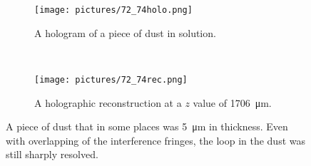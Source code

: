 %
%
%


\begin{figure}[ht!]
    \begin{center}

        \begin{subfigure}[t]{0.4\textwidth}
            \label{fig:72_74holo}
            \texttt{[image: pictures/72\_74holo.png]}
            \caption{A hologram of a piece of dust in solution.}
        \end{subfigure}
        \\
        \begin{subfigure}[t]{\textwidth}
            \label{fig:72_74rec}
            \texttt{[image: pictures/72\_74rec.png]}
            \caption{A holographic reconstruction at a $z$ value of
                \SI{1706}{\micro\meter}.}
        \end{subfigure}


    \end{center}
    \caption{%
        A piece of dust that in some places was \SI{5}{\micro\meter} in
        thickness. Even with overlapping of the interference fringes, the loop in the
        dust was still sharply resolved.
    }%
    \label{fig:72_74}
\end{figure}



